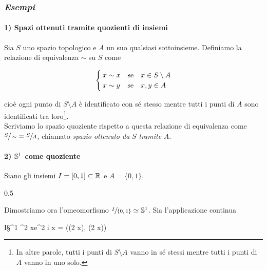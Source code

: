 \subsubsection{\textit{Esempi}}

\paragraph{1) Spazi ottenuti tramite quozienti di insiemi}

Sia $ S $ uno spazio topologico e $ A $ un suo qualsiasi sottoinsieme. Definiamo la relazione di equivalenza $ \sim $ su $ S $ come

\begin{equation}
	\begin{cases}
		x \sim x & \qq*{se} x \in S \setminus A\\
		x \sim y & \qq*{se} x,y \in A
	\end{cases}
\end{equation}

cioè ogni punto di $ S \setminus A $ è identificato con sé stesso mentre tutti i punti di $ A $ sono identificati tra loro\footnote{%
	In altre parole, tutti i punti di $ S \setminus A $ vanno in sé stessi mentre tutti i punti di $ A $ vanno in uno solo.%
}.\\
Scriviamo lo spazio quoziente rispetto a questa relazione di equivalenza come $ \sfrac{S}{\sim} = \sfrac{S}{A} $, chiamato \textit{spazio ottenuto da} $ S $ \textit{tramite} $ A $.

\paragraph{2) $ \S^{1} $ come quoziente}

Siano gli insiemi $ I = [0,1] \subset \R $ e $ A = \{0,1\} $. 

	{0.5}{%
			}
		
Dimostriamo ora l'omeomorfismo $ \sfrac{I}{\{0,1\}} \simeq \S^{1} $. Sia l'applicazione continua

%
	{I}{\S^{1} \subset \R^{2}}%
	{x}{e^{2 i \pi x} = (\cos(2 \pi x), \sin(2 \pi x))}

